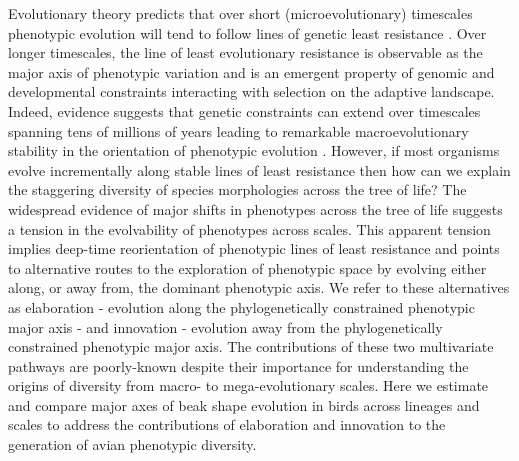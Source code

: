 \documentclass[12pt,letterpaper]{article}
\begin{document}
Evolutionary theory predicts that over short (microevolutionary) timescales phenotypic evolution will tend to follow lines of genetic least resistance \cite{schluter1996adaptive}.
Over longer timescales, the line of least evolutionary resistance is observable as the major axis of phenotypic variation \cite{marroig2005size,fasanelli2022allometry} and is an emergent property of genomic and developmental constraints interacting with selection on the adaptive landscape.
Indeed, evidence suggests that genetic constraints can extend over timescales spanning tens of millions of years leading to remarkable macroevolutionary stability in the orientation of phenotypic evolution \cite{mcglothlin2018adaptive}.
However, if most organisms evolve incrementally along stable lines of least resistance then how can we explain the staggering diversity of species morphologies across the tree of life? The widespread evidence of major shifts in phenotypes across the tree of life \cite{pagel2022general,cooney2017mega,venditti2011multiple,khabbazian2016fast,smaers2021evolution} suggests a tension in the evolvability of phenotypes across scales.
This apparent tension implies deep-time reorientation of phenotypic lines of least resistance and points to alternative routes to the exploration of phenotypic space by evolving either along, or away from, the dominant phenotypic axis.
We refer to these alternatives as elaboration - evolution along the phylogenetically constrained phenotypic major axis - and innovation - evolution away from the phylogenetically constrained phenotypic major axis.
The contributions of these two multivariate pathways are poorly-known despite their importance for understanding the origins of diversity from macro- to mega-evolutionary scales.
Here we estimate and compare major axes of beak shape evolution in birds across lineages and scales to address the contributions of elaboration and innovation to the generation of avian phenotypic diversity.
\end{document}
